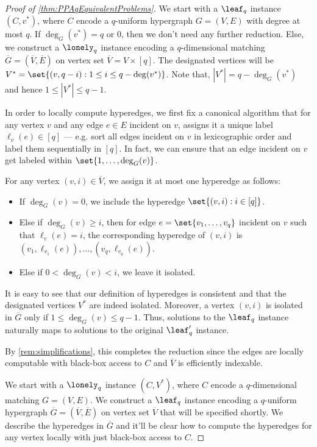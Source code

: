 \begin{proof}[Proof of \autoref{thm:PPAqEquivalentProblems}]
\medskip

 We start with a $\leaf_q$ instance $(C, v^*)$, where $C$ encode a $q$-uniform hypergraph $G = (V, E)$ with degree at most $q$. If $\deg_G(v^*) = q$ or $0$, then we don't need any further reduction. Else, we construct a $\lonely_q$ instance encoding a $q$-dimensional matching $\overline{G} = (\overline{V}, \overline{E})$ on vertex set $\overline{V} = V \times [q]$. The designated vertices will be $V^* = \set{(v,q-i) : 1 \le i \le q - \deg(v^*)}$. Note that, $|V^*| = q - \deg_G(v^*)$ and hence $1 \le |V^*| \le q-1$.

In order to locally compute hyperedges, we first fix a canonical algorithm that for any vertex $v$ and any edge $e \in E$ incident on $v$, assigns it a unique label $\ell_v(e) \in [q]$ --- e.g. sort all edges incident on $v$ in lexicographic order and label them sequentially in $[q]$. In fact, we can ensure that an edge incident on $v$ get labeled within $\set{1, \ldots, \deg_G(v)}$.

For any vertex $(v, i) \in \overline{V}$, we assign it at most one hyperedge as follows:
\begin{itemize}[label=$\triangleright$]
\item If $\deg_G(v) = 0$, we include the hyperedge $\set{(v,i) : i \in [q]}$.
\item Else if $\deg_G(v) \ge i$, then for edge $e = \set{v_1, \ldots, v_q}$ incident on $v$ such that $\ell_v(e)=i$, the corresponding hyperedge of $(v,i)$ is ${(v_1, \ell_{v_1}(e)), \ldots, (v_q, \ell_{v_q}(e))}$.
\item Else if $0 < \deg_G(v) < i$, we leave it isolated.
\end{itemize}

It is easy to see that our definition of hyperedges is consistent and that the designated vertices $V^*$ are indeed isolated. Moreover, a vertex $(v,i)$ is isolated in $\overline{G}$ only if $1 \le \deg_G(v)\le q-1$. Thus, solutions to the $\leaf_q$ instance naturally maps to solutions to the original $\leaf_q'$ instance.

By \autoref{rem:simplifications}, this completes the reduction since the edges are locally computable with black-box access to $C$ and $\overline{V}$ is efficiently indexable.

\medskip

 We start with a $\lonely_q$ instance $(C, V^*)$, where $C$ encode a $q$-dimensional matching $G = (V, E)$. We construct a $\leaf_q$ instance encoding a $q$-uniform hypergraph $\overline{G} = (\overline{V}, \overline{E})$ on vertex set $\overline{V}$ that will be specified shortly. We describe the hyperedges in $\overline{G}$ and it'll be clear how to compute the hyperedges for any vertex locally with just black-box access to $C$.


\end{proof}
